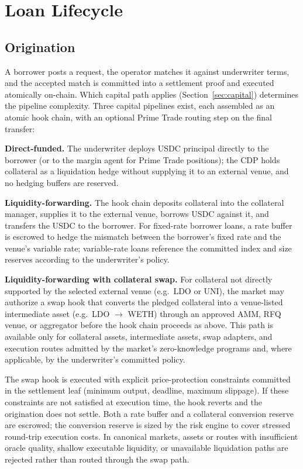 \section{Loan Lifecycle}
\label{sec:lifecycle}

\subsection{Origination}

A borrower posts a request, the operator matches it against underwriter terms, and the accepted match is committed into a settlement proof and executed atomically on-chain. Which capital path applies (Section~\ref{sec:capital}) determines the pipeline complexity. Three capital pipelines exist, each assembled as an atomic hook chain, with an optional Prime Trade routing step on the final transfer:

\textbf{Direct-funded.} The underwriter deploys USDC principal directly to the borrower (or to the margin agent for Prime Trade positions); the CDP holds collateral as a liquidation hedge without supplying it to an external venue, and no hedging buffers are reserved.

\textbf{Liquidity-forwarding.} The hook chain deposits collateral into the collateral manager, supplies it to the external venue, borrows USDC against it, and transfers the USDC to the borrower. For fixed-rate borrower loans, a rate buffer is escrowed to hedge the mismatch between the borrower's fixed rate and the venue's variable rate; variable-rate loans reference the committed index and size reserves according to the underwriter's policy.

\textbf{Liquidity-forwarding with collateral swap.} For collateral not directly supported by the selected external venue (e.g.\ LDO or UNI), the market may authorize a swap hook that converts the pledged collateral into a venue-listed intermediate asset (e.g.\ LDO $\to$ WETH) through an approved AMM, RFQ venue, or aggregator before the hook chain proceeds as above. This path is available only for collateral assets, intermediate assets, swap adapters, and execution routes admitted by the market's zero-knowledge programs and, where applicable, by the underwriter's committed policy.

The swap hook is executed with explicit price-protection constraints committed in the settlement leaf (minimum output, deadline, maximum slippage). If these constraints are not satisfied at execution time, the hook reverts and the origination does not settle. Both a rate buffer and a collateral conversion reserve are escrowed; the conversion reserve is sized by the risk engine to cover stressed round-trip execution costs. In canonical \daloc{} markets, assets or routes with insufficient oracle quality, shallow executable liquidity, or unavailable liquidation paths are rejected rather than routed through the swap path.

